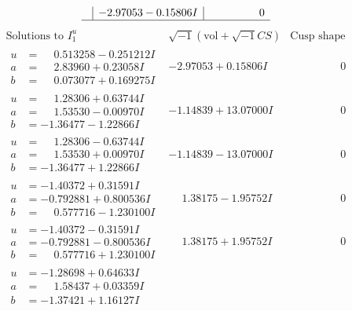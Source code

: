 \documentclass[1p]{elsarticle_modified}
\theoremstyle{definition}
\newcommand{\I}{\sqrt{-1}}
\begin{document}
$$\begin{array}{c|c|c}
 & -2.97053 - 0.15806 I & \phantom{-0.000000 } 0\\
 \hline 
 \end{array}$$\newpage$$\begin{array}{c|c|c}  
\text{Solutions to }I^u_{1}& \I (\text{vol} + \sqrt{-1}CS) & \text{Cusp shape}\\
 \hline 
\begin{aligned}
u &= \phantom{-}0.513258 - 0.251212 I \\
a &= \phantom{-}2.83960 + 0.23058 I \\
b &= \phantom{-}0.073077 + 0.169275 I\end{aligned}
 & -2.97053 + 0.15806 I & \phantom{-0.000000 } 0 \\ \hline\begin{aligned}
u &= \phantom{-}1.28306 + 0.63744 I \\
a &= \phantom{-}1.53530 - 0.00970 I \\
b &= -1.36477 - 1.22866 I\end{aligned}
 & -1.14839 + 13.07000 I & \phantom{-0.000000 } 0 \\ \hline\begin{aligned}
u &= \phantom{-}1.28306 - 0.63744 I \\
a &= \phantom{-}1.53530 + 0.00970 I \\
b &= -1.36477 + 1.22866 I\end{aligned}
 & -1.14839 - 13.07000 I & \phantom{-0.000000 } 0 \\ \hline\begin{aligned}
u &= -1.40372 + 0.31591 I \\
a &= -0.792881 + 0.800536 I \\
b &= \phantom{-}0.577716 - 1.230100 I\end{aligned}
 & \phantom{-}1.38175 - 1.95752 I & \phantom{-0.000000 } 0 \\ \hline\begin{aligned}
u &= -1.40372 - 0.31591 I \\
a &= -0.792881 - 0.800536 I \\
b &= \phantom{-}0.577716 + 1.230100 I\end{aligned}
 & \phantom{-}1.38175 + 1.95752 I & \phantom{-0.000000 } 0 \\ \hline\begin{aligned}
u &= -1.28698 + 0.64633 I \\
a &= \phantom{-}1.58437 + 0.03359 I \\
b &= -1.37421 + 1.16127 I\end{aligned}

\end{array}$$
\end{document}
